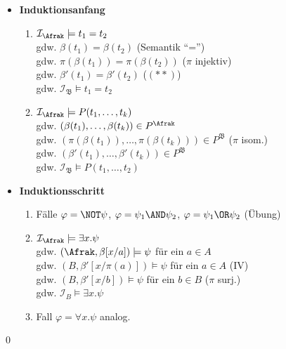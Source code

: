 \begin{itemize}
  \item \textbf{Induktionsanfang}
  \begin{enumerate}
    \item $\mathcal{I}_\Afrak \models t_1=t_2$\\
      gdw. $\beta(t_1) = \beta(t_2)$ (Semantik \enquote{=})\\
      gdw. $\pi(\beta(t_1)) = \pi(\beta(t_2))$ ($\pi$ injektiv)\\
      gdw. $\beta'(t_1) = \beta'(t_2)$ ($(**)$)\\
      gdw. $\mathcal{I}_\mathfrak{B} \models t_1=t_2$
    
    \item $\mathcal{I}_\Afrak \models P(t_1,\dots,t_k)$ \\
      gdw. $(\beta(t_1),\dots,\beta(t_k)) \in P^\Afrak$ \\
      gdw. $(\pi(\beta(t_1)),\dots,\pi(\beta(t_k))) \in P^\mathfrak{B}$ ($\pi$ isom.) \\
      gdw. $(\beta'(t_1),\dots,\beta'(t_k)) \in P^\mathfrak{B}$ \\
      gdw. $\mathcal{I}_\mathfrak{B} \models P(t_1,\dots,t_2)$
  \end{enumerate}
  
  \item \textbf{Induktionsschritt}
  \begin{enumerate}
    \item Fälle $\varphi = \NOT \psi$, $\varphi = \psi_1 \AND \psi_2$, $\varphi = \psi_1 \OR \psi_2$
      (Übung)
      
    \item $\mathcal{I}_\Afrak \models \exists x.\psi$ \\
      gdw. $(\Afrak, \beta[x/a]) \models \psi$ für ein $a \in A$\\
      gdw. $(B, \beta'[x/\pi(a)]) \models \psi$ für ein $a \in A$ (IV)\\
      gdw. $(B, \beta'[x/b]) \models \psi$ für ein $b \in B$ ($\pi$ surj.)\\
      gdw. $\mathcal{I}_B \models \exists x.\psi$
      
    \item Fall $\varphi = \forall x.\psi$ analog.
  \end{enumerate}
\end{itemize}
\qed



